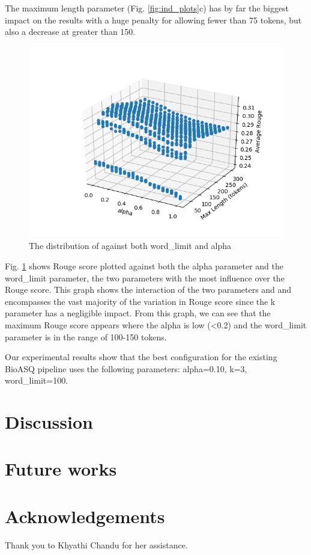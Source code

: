 \documentclass{article}
\begin{document}
    The maximum length parameter (Fig. \ref{fig:ind_plots}c) has by far the biggest impact on the results with a huge penalty for allowing fewer than 75 tokens, but also a decrease at greater than 150.

    \begin{figure}[H]
        \begin{center}
            \includegraphics[width=\textwidth]{fig/alpha_wordcount.png}
        \end{center}
        \caption{The distribution of against both word\_limit and alpha}\label{fig:alpha_wordcount}
    \end{figure}

    Fig. \ref{fig:alpha_wordcount} shows Rouge score plotted against both the alpha parameter and the word\_limit parameter, the two parameters with the most influence over the Rouge score.
    This graph shows the interaction of the two parameters and and encompasses the vast majority of the variation in Rouge score since the k parameter has a negligible impact. From this graph,
    we can see that the maximum Rouge score appears where the alpha is low (<0.2) and the word\_limit parameter is in the range of 100-150 tokens.

    Our experimental results show that the best configuration for the existing BioASQ pipeline uses the following parameters: alpha=0.10, k=3, word\_limit=100.


\section{Discussion}
\section{Future works}

\section*{Acknowledgements}
Thank you to Khyathi Chandu for her assistance.
\end{document}
